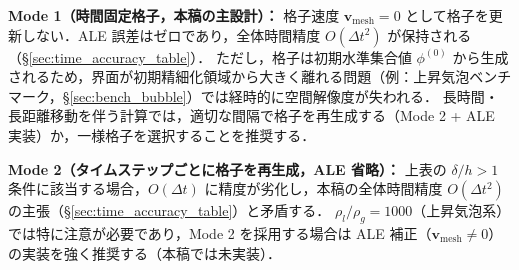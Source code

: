 \textbf{Mode 1（時間固定格子，本稿の主設計）：}
格子速度 $\bm{v}_\text{mesh} = 0$ として格子を更新しない．ALE 誤差はゼロであり，全体時間精度 $O(\Delta t^2)$ が保持される（§\ref{sec:time_accuracy_table}）．
ただし，格子は初期水準集合値 $\phi^{(0)}$ から生成されるため，界面が初期精細化領域から大きく離れる問題（例：上昇気泡ベンチマーク，§\ref{sec:bench_bubble}）では経時的に空間解像度が失われる．
長時間・長距離移動を伴う計算では，適切な間隔で格子を再生成する（Mode 2 + ALE 実装）か，一様格子を選択することを推奨する．

\textbf{Mode 2（タイムステップごとに格子を再生成，ALE 省略）：}
上表の $\delta/h > 1$ 条件に該当する場合，$O(\Delta t)$ に精度が劣化し，本稿の全体時間精度 $O(\Delta t^2)$ の主張（§\ref{sec:time_accuracy_table}）と矛盾する．
$\rho_l/\rho_g = 1000$（上昇気泡系）では特に注意が必要であり，Mode 2 を採用する場合は ALE 補正（$\bm{v}_\text{mesh} \neq 0$）の実装を強く推奨する（本稿では未実装）．

